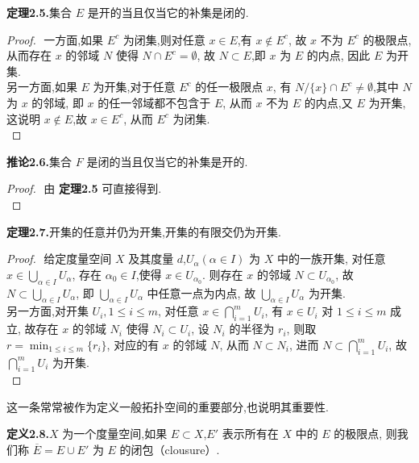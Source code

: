 \documentclass[12pt]{article}
\begin{document}
\textbf{定理2.5.}集合 $E$ 是开的当且仅当它的补集是闭的.
\begin{proof}
    $ $
    一方面,如果 $E^c$ 为闭集,则对任意 $x\in E$,有 $x \notin E^c$,
    故 $x$ 不为 $E^c$ 的极限点,
    从而存在 $x$ 的邻域 $N$ 使得 $N\cap E^c = \emptyset$,
    故 $N\subset E$,即 $x$ 为 $E$ 的内点,
    因此 $E$ 为开集.\\
    另一方面,如果 $E$ 为开集,对于任意 $E^c$ 的任一极限点 $x$,
    有 $N/\{x\} \cap E^c \neq \emptyset$,其中 $N$ 为 $x$ 的邻域,
    即 $x$ 的任一邻域都不包含于 $E$,
    从而 $x$ 不为 $E$ 的内点,又 $E$ 为开集,
    这说明 $x\notin E$,故 $x\in E^c$,
    从而 $E^c$ 为闭集.\\
\end{proof}
\textbf{推论2.6.}集合 $F$ 是闭的当且仅当它的补集是开的.
\begin{proof}
    $ $
    由 \textbf{定理2.5} 可直接得到.\\
\end{proof}

\textbf{定理2.7.}开集的任意并仍为开集,开集的有限交仍为开集.
\begin{proof}
    $ $
    给定度量空间 $X$ 及其度量 $d$,$U_\alpha(\alpha \in I)$ 为 $X$ 中的一族开集,
    对任意 $x\in \bigcup\limits_{\alpha\in I}U_\alpha$,
    存在 $\alpha_0\in I$,使得 $x\in U_{\alpha_0}$.
    则存在 $x$ 的邻域 $N\subset U_{\alpha_0}$,
    故 $N\subset \bigcup\limits_{\alpha\in I}U_\alpha$,
    即 $\bigcup\limits_{\alpha\in I}U_\alpha$ 中任意一点为内点,
    故 $\bigcup\limits_{\alpha\in I}U_\alpha$ 为开集.\\
    另一方面,对开集 $U_i,1\leq i\leq m$,
    对任意 $x\in \bigcap\limits_{i = 1}^m U_i$,
    有 $x\in U_i$ 对 $1\leq i\leq m$ 成立,
    故存在 $x$ 的邻域 $N_i$ 使得 $N_i\subset U_i$,
    设 $N_i$ 的半径为 $r_i$,
    则取 $r = \min_{1\leq i\leq m}\{r_i\}$,
    对应的有 $x$ 的邻域 $N$,
    从而 $N\subset N_i$,
    进而 $N\subset \bigcap\limits_{i = 1}^m U_i$,
    故 $\bigcap\limits_{i = 1}^m U_i$ 为开集.\\
\end{proof}

这一条常常被作为定义一般拓扑空间的重要部分,也说明其重要性.

\textbf{定义2.8.}$X$ 为一个度量空间,如果 $E\subset X$,$E'$ 表示所有在 $X$ 中的 $E$ 的极限点,
则我们称 $\overline{E} = E\cup E'$ 为 $E$ 的闭包（clousure）.
\end{document}
